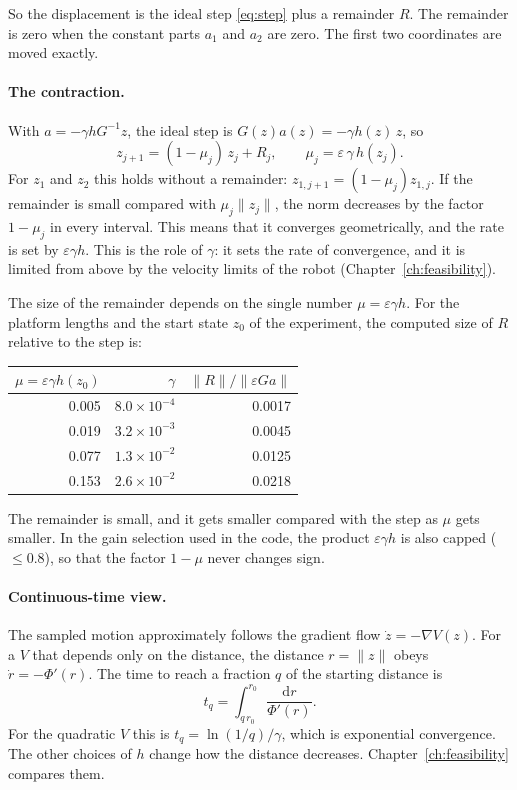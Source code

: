 So the displacement is the ideal step \eqref{eq:step} plus a remainder $R$. The
remainder is zero when the constant parts $a_1$ and $a_2$ are zero. The first two
coordinates are moved exactly.

\paragraph{The contraction.}
With $a=-\gamma hG^{-1}z$, the ideal step is $G(z)a(z)=-\gamma h(z)\,z$, so
\begin{equation}
  z_{j+1}=(1-\mu_j)\,z_j+R_j,\qquad \mu_j=\varepsilon\,\gamma\,h(z_j).
  \label{eq:contraction}
\end{equation}
For $z_1$ and $z_2$ this holds without a remainder:
$z_{1,j+1}=(1-\mu_j)z_{1,j}$. If the remainder is small compared with
$\mu_j\|z_j\|$, the norm decreases by the factor $1-\mu_j$ in every interval.
This means that it converges geometrically, and the rate is set by
$\varepsilon\gamma h$. This is the role of $\gamma$: it sets the rate of
convergence, and it is limited from above by the velocity limits of the robot
(Chapter~\ref{ch:feasibility}).

The size of the remainder depends on the single number
$\mu=\varepsilon\gamma h$. For the platform lengths and the start state $z_0$ of
the experiment, the computed size of $R$ relative to the step is:
\begin{center}
\begin{tabular}{rrr}
  \toprule
  $\mu=\varepsilon\gamma h(z_0)$ & $\gamma$ & $\|R\|/\|\varepsilon G a\|$ \\
  \midrule
  0.005 & $8.0\times10^{-4}$ & 0.0017\\
  0.019 & $3.2\times10^{-3}$ & 0.0045\\
  0.077 & $1.3\times10^{-2}$ & 0.0125\\
  0.153 & $2.6\times10^{-2}$ & 0.0218\\
  \bottomrule
\end{tabular}
\end{center}
The remainder is small, and it gets smaller compared with the step as $\mu$ gets
smaller. In the gain selection used in the code, the product $\varepsilon\gamma h$
is also capped ($\le0.8$), so that the factor $1-\mu$ never changes sign.

\paragraph{Continuous-time view.}
The sampled motion approximately follows the gradient flow
$\dot z=-\nabla V(z)$. For a $V$ that depends only on the distance, the distance
$r=\|z\|$ obeys $\dot r=-\Phi'(r)$. The time to reach a fraction $q$ of the
starting distance is
\begin{equation}
  t_q=\int_{q\,r_0}^{r_0}\frac{\mathrm dr}{\Phi'(r)} .
\end{equation}
For the quadratic $V$ this is $t_q=\ln(1/q)/\gamma$, which is exponential
convergence. The other choices of $h$ change how the distance decreases.
Chapter~\ref{ch:feasibility} compares them.

